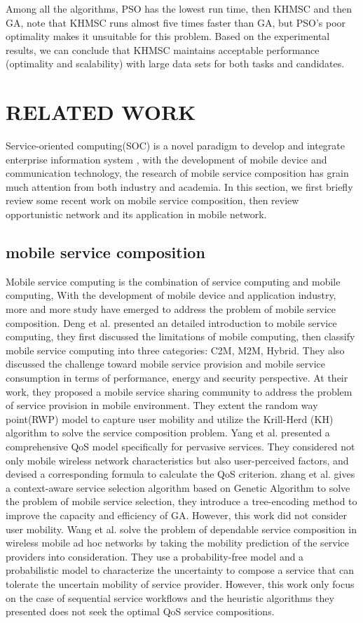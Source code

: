 \documentclass[10pt,journal,compsoc]{IEEEtran}
\begin{document}
Among all the algorithms, PSO has the lowest run time, then KHMSC and then GA, note that KHMSC runs almost five times faster than GA, but PSO's poor optimality makes it unsuitable for this problem. Based on the experimental results, we can conclude that KHMSC maintains acceptable performance (optimality and scalability) with large data sets for both tasks and candidates.

\section{RELATED WORK}
Service-oriented computing(SOC) is a novel paradigm to develop and integrate enterprise information system \cite{}, with the development of mobile device and communication technology, the research of mobile service composition has grain much attention from both industry and academia. In this section, we first briefly review some recent work on mobile service composition, then review opportunistic network and its application in mobile network.

\subsection{mobile service composition}
Mobile service computing is the combination of service computing and mobile computing, With the development of mobile device and application industry, more and more study have emerged to address the problem of mobile service composition. 
Deng et al. \cite{Deng2016} presented an detailed introduction to mobile service computing, they first discussed the limitations of mobile computing, then classify mobile service computing into three categories: C2M, M2M, Hybrid. They also discussed the challenge toward mobile service provision and mobile service consumption in terms of performance, energy and security perspective. At their \cite{Deng2017} work, they proposed a mobile service sharing community to address the problem of service provision in mobile environment. They extent the random way point(RWP) model to capture user mobility and utilize the Krill-Herd (KH) algorithm to solve the service composition problem. Yang et al. \cite{Yang2010} presented a comprehensive QoS model specifically for pervasive services. They considered not only mobile wireless network characteristics but also user-perceived factors, and devised a corresponding formula to calculate the QoS criterion. 
zhang et al. \cite{Zhang2016} gives a context-aware service selection algorithm based on Genetic Algorithm to solve the problem of mobile service selection, they introduce a tree-encoding method to improve the capacity and efficiency of GA. However, this work did not consider user mobility.
Wang et al. \cite{wang2011exploiting} solve the problem of dependable service composition in wireless mobile ad hoc networks by taking the mobility prediction of the service providers into consideration.
They use a probability-free model and a probabilistic model to characterize the uncertainty to compose a service that can tolerate the uncertain mobility of service provider. However, this work only focus on the case of sequential service workflows and the heuristic algorithms they presented does not seek the optimal QoS service compositions.
\end{document}
